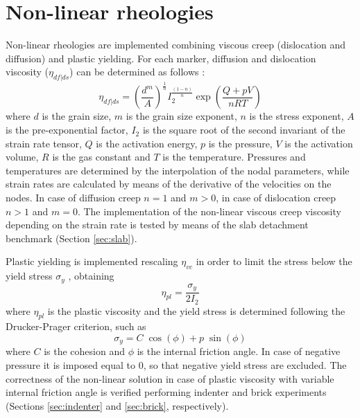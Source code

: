 \documentclass[hidelinks,10pt,a4paper]{article}
\begin{document}
\section{Non-linear rheologies}\label{sec:nonlinear}
Non-linear rheologies are implemented combining viscous creep (dislocation and diffusion) and plastic yielding. For each marker, diffusion and dislocation
viscosity ($\eta_{df|ds}$) can be determined as follows \citep{Karato1993,Wang2016}:
\begin{equation}\label{eq:viscous}
\eta_{df|ds}=\left(\frac{d^m}{A}\right)^{\frac{1}{n}}I_2^{\frac{(1-n)}{n}}\exp\left(\frac{Q+pV}{nRT}\right)
\end{equation}
where $d$ is the grain size, $m$ is the grain size exponent, $n$ is the stress exponent, $A$ is the pre-exponential factor, $I_2$ is the square root of the
second invariant of the strain rate tensor, $Q$ is the activation energy, $p$ is the pressure, $V$ is the activation volume, $R$ is the gas constant and $T$
is the temperature. Pressures and temperatures are determined by the interpolation of the nodal parameters, while strain rates are calculated by means of the
derivative of the velocities on the nodes. In case of diffusion creep $n=1$ and $m>0$, in case of dislocation creep $n>1$ and $m=0$. The implementation of the
non-linear viscous creep viscosity depending on the strain rate is tested by means of the slab detachment benchmark (Section \ref{sec:slab}).

Plastic yielding is implemented rescaling $\eta_{vc}$ in order to limit the stress below the yield stress $\sigma_y$ \citep{Thieulot2008,Thieulot2014,Glerum2018},
obtaining
\begin{equation}\label{eq:plastic}
\eta_{pl}=\frac{\sigma_y}{2I_2}
\end{equation}
where $\eta_{pl}$ is the plastic viscosity and the yield stress is determined following the Drucker-Prager criterion, such as
\begin{equation}\label{eq:yield}
\sigma_y=C\;\cos(\phi)+p\;\sin(\phi)
\end{equation}
where $C$ is the cohesion and $\phi$ is the internal friction angle. In case of negative pressure it is imposed equal to 0, so that negative yield stress are
excluded. The correctness of the non-linear solution in case of plastic viscosity with variable internal friction angle is verified performing indenter and
brick experiments (Sections \ref{sec:indenter} and \ref{sec:brick}, respectively).
\end{document}
